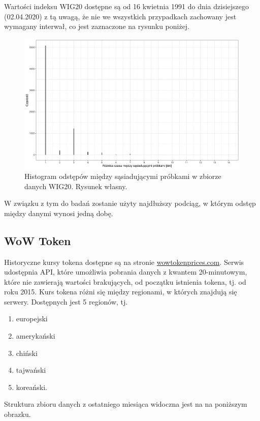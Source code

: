 \documentclass{article}
\begin{document}
Wartości indeksu WIG20 dostępne są od 16 kwietnia 1991 do dnia
dzisiejszego (02.04.2020) z tą uwagą, że nie we wszystkich przypadkach
zachowany jest wymagany interwał, co jest zaznaczone na rysunku poniżej.

\begin{figure}[H]
  \centering
  \includegraphics[width=.75\textwidth]{./images/tdiff.png}
  \caption{Histogram odstępów między sąsiadującymi próbkami w zbiorze danych WIG20. Rysunek własny.}
\end{figure}

W związku z tym do badań zostanie użyty najdłuższy podciąg, w którym
odstęp między danymi wynosi jedną dobę.

\hypertarget{wow-token}{%
\subsection{WoW Token}\label{wow-token}}

Historyczne kursy tokena dostępne są na stronie
\href{https://wowtokenprices.com/}{wowtokenprices.com}. Serwis
udostępnia API, które umożliwia pobrania danych z kwantem 20-minutowym,
które nie zawierają wartości brakujących, od początku istnienia tokena,
tj. od roku 2015. Kurs tokena różni się między regionami, w których
znajdują się serwery. Dostępnych jest 5 regionów, tj.

\begin{enumerate}
\def\labelenumi{\arabic{enumi}.}
\item
  europejski
\item
  amerykański
\item
  chiński
\item
  tajwański
\item
  koreański.
\end{enumerate}

Struktura zbioru danych z ostatniego miesiąca widoczna jest na na
poniższym obrazku.
\end{document}
